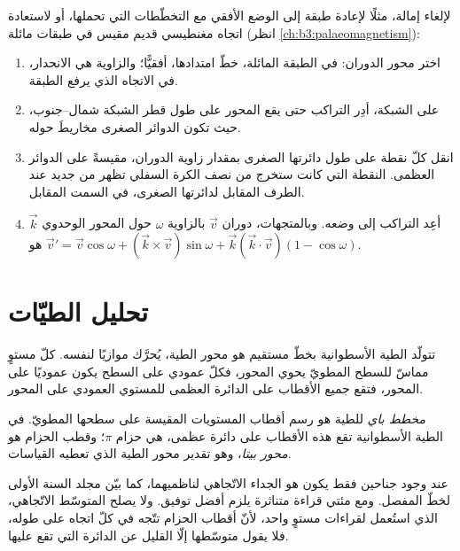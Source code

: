\begin{method}\label{met:b3:structural-analysis:rotation}
لإلغاء إمالة، مثلًا لإعادة طبقة إلى الوضع الأفقي مع
التخطّطات التي تحملها، أو لاستعادة اتجاه مغنطيسي قديم مقيس في
طبقات مائلة (انظر \cref{ch:b3:palaeomagnetism}):
\begin{enumerate}
  \item اختر محور الدوران: في الطبقة المائلة، خطّ امتدادها،
        أفقيًّا؛ والزاوية هي الانحدار، في الاتجاه الذي يرفع الطبقة.
  \item على الشبكة، أدِر التراكب حتى يقع المحور على طول
        قطر الشبكة شمال--جنوب، حيث تكون الدوائر الصغرى مخاريطَ
        حوله.
  \item انقل كلّ نقطة على طول دائرتها الصغرى بمقدار زاوية الدوران،
        مقيسةً على الدوائر العظمى. النقطة التي كانت ستخرج من نصف الكرة السفلي
        تظهر من جديد عند الطرف المقابل لدائرتها الصغرى، في
        السمت المقابل.
  \item أعِد التراكب إلى وضعه. وبالمتجهات، دوران $\vec v$ بالزاوية
        $\omega$ حول المحور الوحدوي $\vec k$ هو $\vec v' = \vec v
        \cos\omega + (\vec k\times\vec v)\sin\omega + \vec k(\vec k\cdot\vec
        v)(1 - \cos\omega)$.
\end{enumerate}
\end{method}

\section{تحليل الطيّات}\label{sec:b3:structural-analysis:folds}

تتولّد الطية الأسطوانية بخطّ مستقيم هو محور الطية، يُحرَّك
موازيًا لنفسه. كلّ مستوٍ مماسّ للسطح المطويّ يحوي المحور، فكلّ عمودي على السطح يكون
عموديًا على المحور، فتقع جميع
الأقطاب على الدائرة العظمى للمستوي العمودي على المحور.

\begin{definition}\label{def:b3:structural-analysis:pi}
\emph{مخطط باي} للطية هو رسم أقطاب
المستويات المقيسة على سطحها المطويّ. في الطية الأسطوانية تقع هذه الأقطاب على دائرة عظمى، هي
حزام $\pi$؛ وقطب الحزام هو
\emph{محور بيتا}، وهو تقدير محور الطية الذي تعطيه
القياسات.
\end{definition}

عند وجود جناحين فقط يكون  هو الجداء الاتّجاهي لناظميهما، كما بيّن
مجلد السنة الأولى لخطّ المفصل. ومع مئتي قراءة متناثرة يلزم أفضل توفيق.
ولا يصلح المتوسّط الاتّجاهي، الذي استُعمل لقراءات مستوٍ واحد، لأنّ أقطاب الحزام
تتّجه في كلّ اتجاه على طوله، فلا يقول متوسّطها إلّا القليل
عن الدائرة التي تقع عليها.

